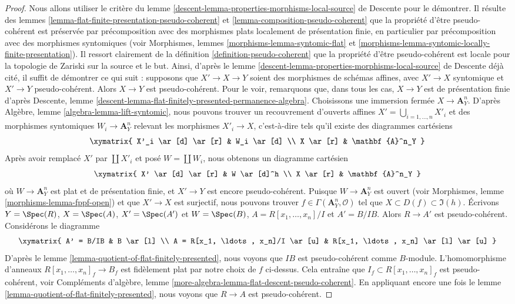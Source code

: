 \begin{proof}
Nous allons utiliser le critère du
lemme \ref{descent-lemma-properties-morphisms-local-source} de Descente
pour le démontrer. Il résulte des
lemmes \ref{lemma-flat-finite-presentation-pseudo-coherent} et
\ref{lemma-composition-pseudo-coherent}
que la propriété d'être pseudo-cohérent est préservée par précomposition avec des
morphismes plats localement de présentation finie, en particulier par
précomposition avec des morphismes syntomiques (voir
Morphismes, lemmes \ref{morphisms-lemma-syntomic-flat} et
\ref{morphisms-lemma-syntomic-locally-finite-presentation}).
Il ressort clairement de la
définition \ref{definition-pseudo-coherent}
que la propriété d'être pseudo-cohérent est
locale pour la topologie de Zariski sur la source et le but.
Ainsi, d'après le
lemme \ref{descent-lemma-properties-morphisms-local-source} de Descente déjà cité,
il suffit de démontrer ce qui suit : supposons que $X' \to X \to Y$ soient des
morphismes de schémas affines, avec $X' \to X$ syntomique et $X' \to Y$
pseudo-cohérent. Alors $X \to Y$ est pseudo-cohérent.
Pour le voir, remarquons que, dans tous les cas, $X \to Y$ est de présentation finie d'après
Descente, lemme \ref{descent-lemma-flat-finitely-presented-permanence-algebra}.
Choisissons une immersion fermée $X \to \mathbf{A}^n_Y$. D'après
Algèbre, lemme \ref{algebra-lemma-lift-syntomic},
nous pouvons trouver un recouvrement d'ouverts affines $X' = \bigcup_{i = 1, \ldots, n} X'_i$
et des morphismes syntomiques $W_i \to \mathbf{A}^n_Y$ relevant les morphismes
$X'_i \to X$, c'est-à-dire tels qu'il existe des diagrammes cartésiens
$$
\xymatrix{
X'_i \ar[d] \ar[r] & W_i \ar[d] \\
X \ar[r] & \mathbf{A}^n_Y
}
$$
Après avoir remplacé $X'$ par $\coprod X'_i$ et posé $W = \coprod W_i$,
nous obtenons un diagramme cartésien
$$
\xymatrix{
X' \ar[d] \ar[r] & W \ar[d]^h \\
X \ar[r] & \mathbf{A}^n_Y
}
$$
où $W \to \mathbf{A}^n_Y$ est plat et de présentation finie, et
$X' \to Y$ est encore pseudo-cohérent. Puisque
$W \to \mathbf{A}^n_Y$ est ouvert (voir
Morphismes, lemme \ref{morphisms-lemma-fppf-open})
et que $X' \to X$ est surjectif, nous pouvons trouver
$f \in \Gamma(\mathbf{A}^n_Y, \mathcal{O})$ tel que
$X \subset D(f) \subset \Im(h)$. Écrivons
$Y = \Spec(R)$, $X = \Spec(A)$, $X' = \Spec(A')$
et $W = \Spec(B)$, $A = R[x_1, \ldots, x_n]/I$ et
$A' = B/IB$. Alors $R \to A'$ est pseudo-cohérent. Considérons le diagramme
$$
\xymatrix{
A' = B/IB & B \ar[l] \\
A = R[x_1, \ldots, x_n]/I \ar[u] & R[x_1, \ldots, x_n] \ar[l] \ar[u]
}
$$
D'après le
lemme \ref{lemma-quotient-of-flat-finitely-presented},
nous voyons que $IB$ est pseudo-cohérent comme $B$-module.
L'homomorphisme d'anneaux $R[x_1, \ldots, x_n]_f \to B_f$ est fidèlement plat par
notre choix de $f$ ci-dessus. Cela entraîne que
$I_f \subset R[x_1, \ldots, x_n]_f$
est pseudo-cohérent, voir
Compléments d'algèbre, lemme \ref{more-algebra-lemma-flat-descent-pseudo-coherent}.
En appliquant encore une fois le
lemme \ref{lemma-quotient-of-flat-finitely-presented},
nous voyons que $R \to A$ est pseudo-cohérent.
\end{proof}

